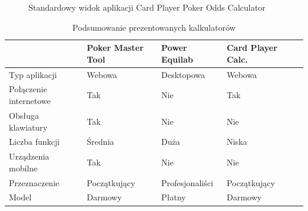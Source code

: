 \begin{figure}[!htbp]
    \caption{Standardowy widok aplikacji Card Player Poker Odds Calculator}
    \label{fig:card-player-view}    
\end{figure}

\begin{table}[h]
    \centering
    \begin{tabular}{lllll}
        {} & Poker Master Tool & Power Equilab & Card Player Calc.\\
        \midrule
        Typ aplikacji & Webowa  & Desktopowa & Webowa \\
        Połączenie internetowe & Tak & Nie & Tak \\
        Obsługa klawiatury & Tak & Nie & Nie \\
        Liczba funkcji & Średnia & Duża & Niska \\
        Urządzenia mobilne & Tak & Nie & Nie \\
        Przeznaczenie & Początkujący & Profesjonaliści & Początkujący \\
        Model & Darmowy & Płatny & Darmowy \\
        \bottomrule
    \end{tabular}
    \caption{Podsumowanie prezentowanych kalkulatorów}
\end{table}